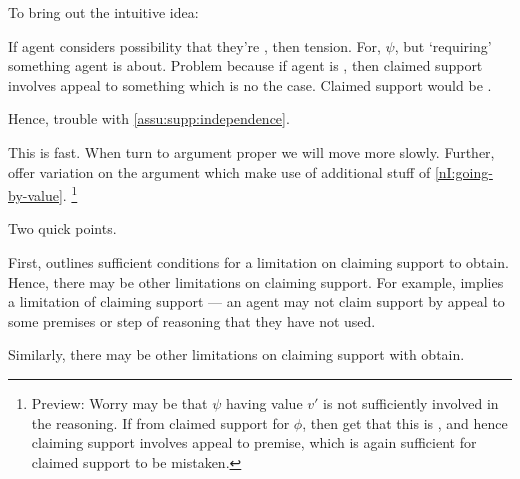 \begin{note}
  To bring out the intuitive idea:

  If agent considers possibility that they're \mom{}, then tension.
  For, \(\psi\), but `requiring' something agent is \mom{} about.
  Problem because if agent is \mom{}, then claimed support involves appeal to something which is no the case.
  Claimed support would be \mom{}.

  Hence, trouble with \autoref{assu:supp:independence}.

  This is fast.
  When turn to argument proper we will move more slowly.
  Further, offer variation on the argument which make use of additional stuff of \ref{nI:going-by-value}.\nolinebreak
  \footnote{
    Preview:
    Worry may be that \(\psi\) having value \(v'\) is not sufficiently involved in the reasoning.
    If from claimed support for \(\phi\), then get that this is \mom{}, and hence claiming support involves appeal to \mom{} premise, which is again sufficient for claimed support to be mistaken.
  }
\end{note}

\begin{note}
  Two quick points.
\end{note}

\begin{note}
  First, \nI{} outlines sufficient conditions for a limitation on claiming support to obtain.
  Hence, there may be other limitations on claiming support.
  For example, \ESU{} implies a limitation of claiming support --- an agent may not claim support by appeal to some premises or step of reasoning that they have not used.

  Similarly, there may be other limitations on claiming support with obtain.
\end{note}

